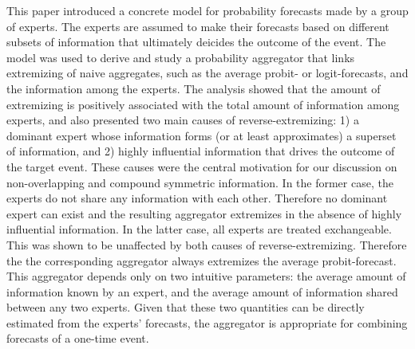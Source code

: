 \documentclass[11pt]{article}
\theoremstyle{definition}
\theoremstyle{definition}
\begin{document}
This paper introduced a concrete model for probability forecasts made by a group of experts. The experts are assumed to make their forecasts based on different subsets of information that ultimately deicides the outcome of the event. The model was used to derive and study a probability aggregator that links extremizing of naive aggregates, such as the average probit- or logit-forecasts, and the information among the experts. The analysis showed that the amount of extremizing is positively associated with the total amount of information among experts, and also presented two main causes of reverse-extremizing: 1) a dominant expert whose information forms (or at least approximates) a superset of information, and 2) highly influential information that drives the outcome of the target event. These causes were the central motivation for our discussion on non-overlapping and compound symmetric information. In the former case, the experts do not share any information with each other. Therefore no dominant expert can exist and the resulting aggregator extremizes in the absence of highly influential information. In the latter case, all experts are treated exchangeable.  This was shown to be unaffected by both causes of reverse-extremizing. Therefore the the corresponding aggregator always extremizes the average probit-forecast. This aggregator depends only on two intuitive parameters: the average amount of information known by an expert, and the average amount of information shared between any two experts. Given that these two quantities can be directly estimated from the experts' forecasts, the aggregator is appropriate for combining forecasts of a one-time event. 
\end{document}

